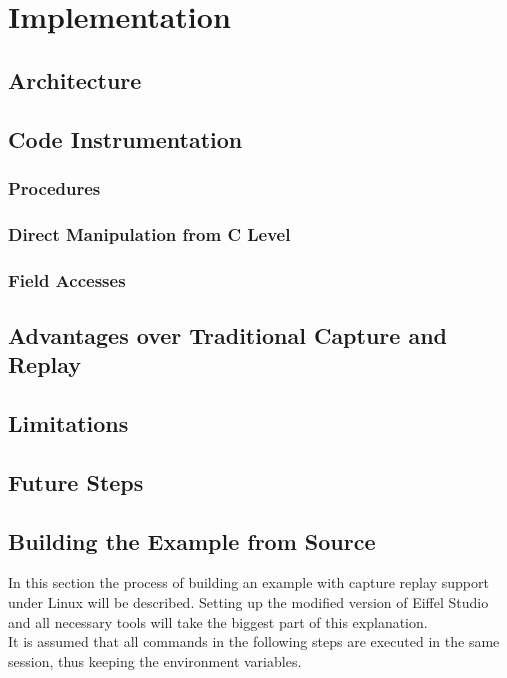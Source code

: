 
\chapter{Implementation}
\section{Architecture}
\section{Code Instrumentation}
\subsection{Procedures}
\subsection{Direct Manipulation from C Level}
\subsection{Field Accesses}
\section{Advantages over Traditional Capture and Replay}
\section{Limitations}
\section{Future Steps}
\section{Building the Example from Source}
In this section the process of building an example with capture replay support under Linux will be described. Setting up the modified version of Eiffel Studio and all necessary tools will take the biggest part of this explanation.\\
It is assumed that all commands in the following steps are executed in the same session, thus keeping the environment variables.\\

